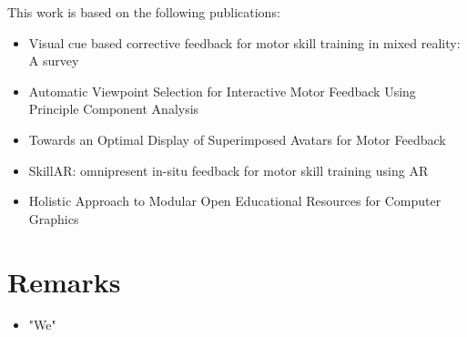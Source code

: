 This work is based on the following publications:
\begin{itemize}
	\item Visual cue based corrective feedback for motor skill training in mixed reality: A survey \cite{diller2022vcb}
	\item Automatic Viewpoint Selection for Interactive Motor Feedback Using Principle Component Analysis \cite{diller2024automatic}
	\item Towards an Optimal Display of Superimposed Avatars for Motor Feedback \cite{}
	\item SkillAR: omnipresent in-situ feedback for motor skill training using AR \cite{diller2024skillar}
	\item Holistic Approach to Modular Open Educational Resources for Computer Graphics \cite{diller2024holistic}
\end{itemize}

\section{Remarks}

\begin{itemize}
	\item "We"
\end{itemize}